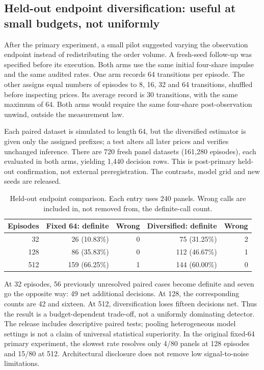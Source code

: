 \documentclass[11pt,a4paper]{article}
\theoremstyle{definition}
\theoremstyle{remark}
\begin{document}
\subsection{Held-out endpoint diversification: useful at small budgets, not uniformly}
After the primary experiment, a small pilot suggested varying the observation endpoint instead of redistributing the order volume. A fresh-seed follow-up was specified before its execution. Both arms use the same initial four-share impulse and the same audited rates. One arm records 64 transitions per episode. The other assigns equal numbers of episodes to 8, 16, 32 and 64 transitions, shuffled before inspecting prices. Its average record is 30 transitions, with the same maximum of 64. Both arms would require the same four-share post-observation unwind, outside the measurement law.

Each paired dataset is simulated to length 64, but the diversified estimator is given only the assigned prefixes; a test alters all later prices and verifies unchanged inference. There are 720 fresh panel datasets (161,280 episodes), each evaluated in both arms, yielding 1,440 decision rows. This is post-primary held-out confirmation, not external preregistration. The contrasts, model grid and new seeds are released.

\begin{table}[htbp]
\centering\small
\caption{Held-out endpoint comparison. Each entry uses 240 panels. Wrong calls are included in, not removed from, the definite-call count.}
\label{tab:endpoint_results}
\begin{tabular}{r r r r r}
\toprule
Episodes & Fixed 64: definite & Wrong & Diversified: definite & Wrong\\
\midrule
32 & 26 (10.83\%) & 0 & 75 (31.25\%) & 2\\
128 & 86 (35.83\%) & 0 & 112 (46.67\%) & 1\\
512 & 159 (66.25\%) & 1 & 144 (60.00\%) & 0\\
\bottomrule
\end{tabular}
\end{table}

At 32 episodes, 56 previously unresolved paired cases become definite and seven go the opposite way: 49 net additional decisions. At 128, the corresponding counts are 42 and sixteen. At 512, diversification loses fifteen decisions net. Thus the result is a budget-dependent trade-off, not a uniformly dominating detector. The release includes descriptive paired tests; pooling heterogeneous model settings is not a claim of universal statistical superiority. In the original fixed-64 primary experiment, the slowest rate resolves only 4/80 panels at 128 episodes and 15/80 at 512. Architectural disclosure does not remove low signal-to-noise limitations.
\end{document}
